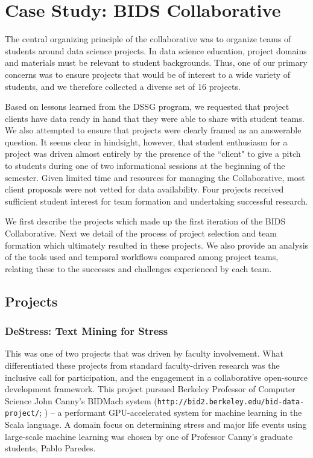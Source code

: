 \documentclass[12pt]{article}
\begin{document}
\section{Case Study: BIDS Collaborative}

The central organizing principle of the collaborative was to organize teams of students around data science projects. In data science education, project domains and materials must be relevant to student backgrounds. Thus, one of our primary concerns was to ensure projects that would be of interest to a wide variety of students, and we therefore collected a diverse set of 16 projects. 

Based on lessons learned from the DSSG program, we requested that project clients have data ready in hand that they were able to share with student teams. We also attempted to ensure that projects were clearly framed as an answerable question. It seems clear in hindsight, however, that student enthusiasm for a project was driven almost entirely by the presence of the ``client" to give a pitch to students during one of two informational sessions at the beginning of the semester. Given limited time and resources for managing the Collaborative, most client proposals were not vetted for data availability. Four projects received sufficient student interest for team formation and undertaking successful research.

We first describe the projects which made up the first iteration of the BIDS Collaborative.  Next we detail of the process of project selection and team formation which ultimately resulted in these projects.  We also provide an analysis of the tools used and temporal workflows compared among project teams, relating these to the successes and challenges experienced by each team.

\subsection{Projects}

\subsubsection*{DeStress: Text Mining for Stress}

This was one of two projects that was driven by faculty involvement. What differentiated these projects from standard faculty-driven research was the inclusive call for participation, and the engagement in a collaborative open-source development framework. This project pursued Berkeley Professor of Computer Science John Canny's BIDMach system (\texttt{http://bid2.berkeley.edu/bid-data-project/}; \cite{canny2013bidmach}) -- a performant GPU-accelerated system for machine learning in the Scala language. A domain focus on determining stress and major life events using large-scale machine learning was chosen by one of Professor Canny's graduate students, Pablo Paredes.
\end{document}
